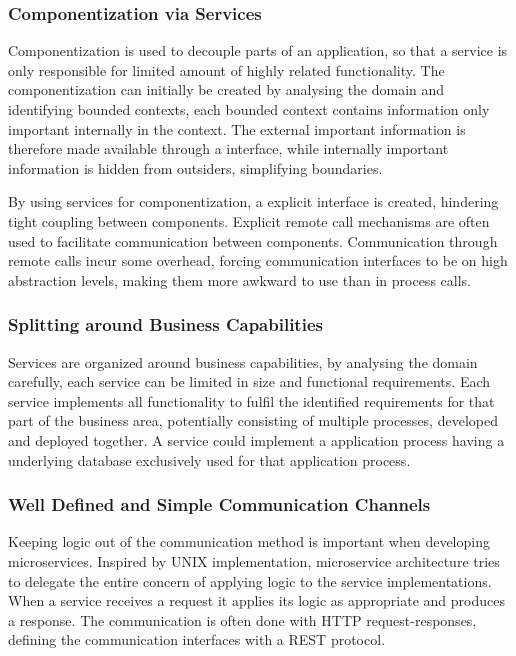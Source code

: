 \subsubsection*{Componentization via Services}
Componentization is used to decouple parts of an application, so that a service is only responsible for limited amount of highly related functionality\cite{morgantini2013whatAreMicroServices}. The componentization can initially be created by analysing the domain and identifying bounded contexts\cite[p.~31]{newman2015microservices}, each bounded context contains information only important internally in the context. 
The external important information is therefore made available through a interface, while internally important information is hidden from outsiders, simplifying boundaries.

By using services for componentization, a explicit interface is created, hindering tight coupling between components. Explicit remote call mechanisms are often used to facilitate communication between components. Communication through remote calls incur some overhead, forcing communication interfaces to be on high abstraction levels, making them more awkward to use than in process calls.

\subsubsection*{Splitting around Business Capabilities}
Services are organized around business capabilities, by analysing the domain carefully, each service can be limited in size and functional requirements. Each service implements all functionality to fulfil the identified requirements for that part of the business area, potentially consisting of multiple processes, developed and deployed together. A service could implement a application process having a underlying database exclusively used for that application process\cite{fowler2014microservices}.

\subsubsection*{Well Defined and Simple Communication Channels}
Keeping logic out of the communication method is important when developing microservices. Inspired by UNIX implementation, microservice architecture tries to delegate the entire concern of applying logic to the service implementations. When a service receives a request it applies its logic as appropriate and produces a response. The communication is often done with HTTP request-responses, defining the communication interfaces with a REST protocol\cite{fowler2014microservices}.

